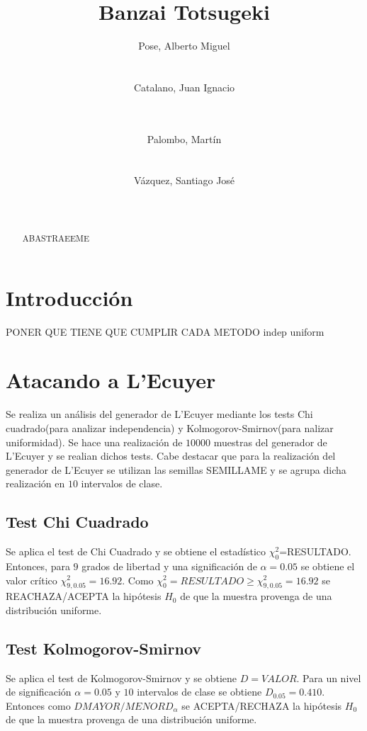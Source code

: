 \documentclass{sig-alternate}
\title{Banzai Totsugeki}
\author{
\alignauthor
Pose, Alberto Miguel\\
       \affaddr{Instituto Tecnol\'ogico de Buenos Aires}\\
       \affaddr{Buenos Aires, Argentina}\\
       \email{apose@alu.itba.edu.ar}
\alignauthor
Catalano, Juan Ignacio\\
       \affaddr{Instituto Tecnol\'ogico de Buenos Aires}\\
       \affaddr{Buenos Aires, Argentina}\\
       \email{jcatalan@alu.itba.edu.ar}
\and
\alignauthor 
Palombo, Mart\'in\\
       \affaddr{Instituto Tecnol\'ogico de Buenos Aires}\\
       \affaddr{Buenos Aires, Argentina}\\
       \email{mpalombo@alu.itba.edu.ar}
\alignauthor 
V\'azquez, Santiago Jos\'e\\
       \affaddr{Instituto Tecnol\'ogico de Buenos Aires}\\
       \affaddr{Buenos Aires, Argentina}\\
       \email{savazque@alu.itba.edu.ar}
}
\date{}
\begin{document}
\maketitle

\begin{abstract}
ABASTRAEEME
\end{abstract} 

\newpage

\section{Introducci\'on}

PONER QUE TIENE QUE CUMPLIR CADA METODO indep uniform
\section{Atacando a L'Ecuyer}
\label{sec:goingdown}

Se realiza un an\'alisis del generador de L'Ecuyer mediante los tests Chi cuadrado(para analizar independencia) y Kolmogorov-Smirnov(para nalizar uniformidad).
Se hace una realizaci\'on de $10000$ muestras del generador de L'Ecuyer y se realian dichos tests.
Cabe destacar que para la realizaci\'on del generador de L'Ecuyer se utilizan las semillas SEMILLAME y 
se agrupa dicha realizaci\'on en $10$ intervalos de clase.

\subsection{Test Chi Cuadrado}
\label{sec:chi}
Se aplica el test de Chi Cuadrado y se obtiene el estad\'istico $\chi_{0}^{2}$=RESULTADO.
Entonces, para $9$ grados de libertad y una significaci\'on de $\alpha=0.05$ se obtiene
el valor cr\'itico $\chi_{9,0.05}^{2}=16.92$.
Como $\chi_{0}^{2}=RESULTADO \geq \chi_{9,0.05}^{2}=16.92$ se REACHAZA/ACEPTA la hip\'otesis $H_{0}$
de que la muestra provenga de una distribuci\'on uniforme.

\subsection{Test Kolmogorov-Smirnov}
\label{sec:kolmogorov}
Se aplica el test de Kolmogorov-Smirnov y se obtiene $D=VALOR$.
Para un nivel de significaci\'on $\alpha=0.05$ y $10$ intervalos de clase
se obtiene $D_{0.05}=0.410$. Entonces como $D MAYOR/MENOR D_{\alpha}$
se ACEPTA/RECHAZA la hip\'otesis $H_{0}$
de que la muestra provenga de una distribuci\'on uniforme.
\end{document}
